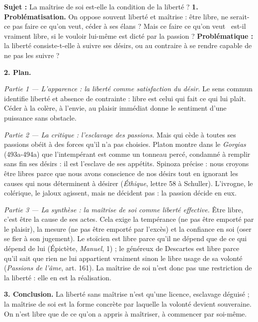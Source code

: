 \documentclass[11pt]{article}
\begin{document}
\begin{exoresolu}
\textbf{Sujet :} La maîtrise de soi est-elle la condition de la liberté ?
\tcblower
\textbf{1. Problématisation.} On oppose souvent liberté et maîtrise : être libre, ne serait-ce pas faire ce qu'on veut, céder à ses élans ? Mais ce \guillemotleft faire ce qu'on veut \guillemotright\ est-il vraiment libre, si le vouloir lui-même est dicté par la passion ? \textbf{Problématique :} la liberté consiste-t-elle à suivre ses désirs, ou au contraire à se rendre capable de ne pas les suivre ?

\textbf{2. Plan.}

\emph{Partie 1 — L'apparence : la liberté comme satisfaction du désir.} Le sens commun identifie liberté et absence de contrainte : libre est celui qui fait ce qui lui plaît. Céder à la colère, à l'envie, au plaisir immédiat donne le sentiment d'une puissance sans obstacle.

\emph{Partie 2 — La critique : l'esclavage des passions.} Mais qui cède à toutes ses passions obéit à des forces qu'il n'a pas choisies. Platon montre dans le \emph{Gorgias} (493a-494a) que l'intempérant est comme un tonneau percé, condamné à remplir sans fin ses désirs : il est l'esclave de ses appétits. Spinoza précise : nous croyons être libres parce que nous avons conscience de nos désirs tout en ignorant les causes qui nous déterminent à désirer (\emph{Éthique}, lettre 58 à Schuller). L'ivrogne, le colérique, le jaloux agissent, mais ne décident pas : la passion décide en eux.

\emph{Partie 3 — La synthèse : la maîtrise de soi comme liberté effective.} Être libre, c'est être la cause de ses actes. Cela exige la tempérance (ne pas être emporté par le plaisir), la mesure (ne pas être emporté par l'excès) et la confiance en soi (oser se fier à son jugement). Le stoïcien est libre parce qu'il ne dépend que de ce qui dépend de lui (Épictète, \emph{Manuel}, 1) ; le généreux de Descartes est libre parce qu'il sait que rien ne lui appartient vraiment sinon le libre usage de sa volonté (\emph{Passions de l'âme}, art. 161). La maîtrise de soi n'est donc pas une restriction de la liberté : elle en est la réalisation.

\textbf{3. Conclusion.} La liberté sans maîtrise n'est qu'une licence, esclavage déguisé ; la maîtrise de soi est la forme concrète par laquelle la volonté devient souveraine. On n'est libre que de ce qu'on a appris à maîtriser, à commencer par soi-même.
\end{exoresolu}
\end{document}
